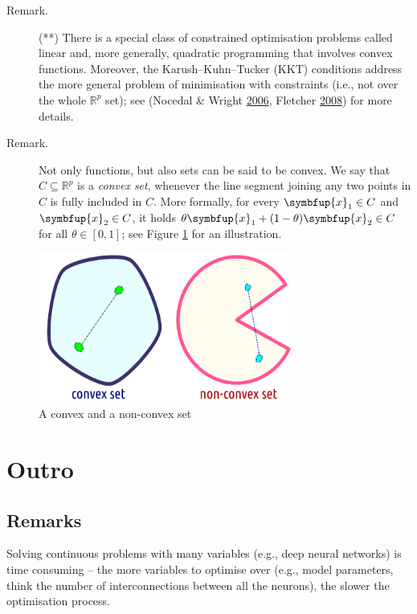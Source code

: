 \documentclass[10pt,b5paper,krantz1]{krantz}
\renewcommand{\mathbf}[1]{\symbfup{#1}}
\begin{document}
\begin{description}
\item[Remark.]
(**) There is a special class of constrained optimisation
problems called linear and, more generally, quadratic programming that involves
convex functions.
Moreover, the Karush--Kuhn--Tucker (KKT) conditions address the more
general problem of minimisation with constraints (i.e., not over the whole
\(\mathbb{R}^p\) set); see (Nocedal \& Wright \protect\hyperlink{ref-nocedal_wright}{2006}, Fletcher \protect\hyperlink{ref-fletcher}{2008}) for more details.
\item[Remark.]
Not only functions, but also sets can be said to be convex.
We say that \(C\subseteq \mathbb{R}^p\) is a \emph{convex set},
whenever the line segment joining any two points in \(C\)
is fully included in \(C\). More formally,
for every \(\mathbf{x}_1\in C\) and \(\mathbf{x}_2\in C\),
it holds \(\theta \mathbf{x}_{1}+(1-\theta)\mathbf{x}_{2} \in C\) for
all \(\theta\in [0,1]\); see Figure \ref{fig:convex_set} for an illustration.
\end{description}

\begin{figure}
\hypertarget{fig:convex_set}{%
\centering
\includegraphics[width=0.75\textwidth,height=\textheight]{figures/convex_set.pdf}
\caption{A convex and a non-convex set}\label{fig:convex_set}
}
\end{figure}

\hypertarget{outro-5}{%
\section{Outro}\label{outro-5}}

\hypertarget{remarks-5}{%
\subsection{Remarks}\label{remarks-5}}

Solving continuous problems with many variables (e.g., deep neural networks)
is time consuming -- the more variables to optimise over (e.g.,
model parameters, think the number of interconnections between all the neurons), the slower
the optimisation process.
\end{document}
